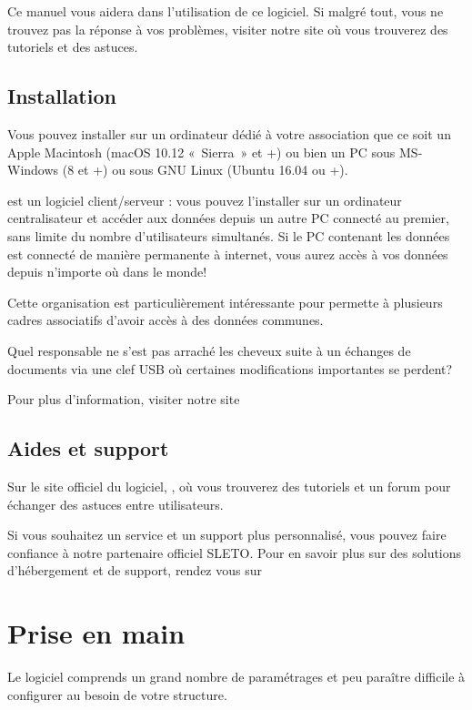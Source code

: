 \documentclass[a4paper,10pt,oneside,french]{sphinxmanual}
\begin{document}
Ce manuel vous aidera dans l’utilisation de ce logiciel.
Si malgré tout, vous ne trouvez pas la réponse à vos problèmes, visiter notre site  où vous trouverez des tutoriels et des astuces.


\subsection{Installation}
\label{\detokenize{asso/presentation:installation}}
Vous pouvez installer  sur un ordinateur dédié à votre association que ce soit un Apple Macintosh (macOS 10.12 « Sierra » et +) ou bien un PC sous MS-Windows (8 et +) ou sous GNU Linux (Ubuntu 16.04 ou +).

 est un logiciel client/serveur : vous pouvez l’installer sur un ordinateur centralisateur et accéder aux données depuis un autre PC connecté au premier, sans limite du nombre d’utilisateurs simultanés.
Si le PC contenant les données est connecté de manière permanente à internet, vous aurez accès à vos données depuis n’importe où dans le monde!

Cette organisation est particulièrement intéressante pour permette à plusieurs cadres associatifs d’avoir accès à des données communes.

Quel responsable ne s’est pas arraché les cheveux suite à un échanges de documents via une clef USB où certaines modifications importantes se perdent?

Pour plus d’information, visiter notre site 


\subsection{Aides et support}
\label{\detokenize{asso/presentation:aides-et-support}}
Sur le site officiel du logiciel, , où vous trouverez des tutoriels et un forum pour échanger des astuces entre utilisateurs.

Si vous souhaitez un service et un support plus personnalisé, vous pouvez faire confiance à notre partenaire officiel SLETO.
Pour en savoir plus sur des solutions d’hébergement et de support, rendez vous sur 


\section{Prise en main}
\label{\detokenize{asso/first_step:prise-en-main}}\label{\detokenize{asso/first_step::doc}}
Le logiciel  comprends un grand nombre de paramétrages et peu paraître difficile à configurer au besoin de votre structure.
\end{document}
